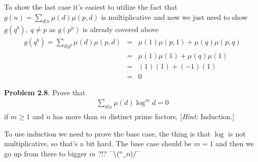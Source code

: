 \documentclass[aps,preprint,preprintnumbers,nofootinbib,showpacs,prd]{revtex4-1}
\newcommand{\nbea}{\begin{eqnarray*}}
\newcommand{\neea}{\end{eqnarray*}}
\newcommand{\dunno}{$ {}^{\mbox {--}}\backslash(^{\rm o}{}\underline{\hspace{0.2cm}}{\rm o})/^{\mbox {--}}$}
\begin{document}
To show the last case it's easiest to utilize the fact that $g(n) = \sum_{d|n}\mu(d)\mu(p,d)$ is multiplicative and now we just need to show $g(q^b), ~q\neq p$ as $g(p^a)$ is already covered above
%
\nbea
g(q^b) = \sum_{d|q^b}\mu(d)\mu(p,d) & = & \mu(1)\mu(p,1) + \mu(q)\mu(p,q) \\
& = & \mu(1)\mu(1) + \mu(q)\mu(1) \\
& = & (1)(1) + (-1)(1) \\
& = & 0
\neea
%

{\bf Problem 2.8}. Prove that
%
\nbea
\sum_{d|n} \mu(d) \log^m d = 0
\neea
%
if $m \ge 1$ and $n$ has more than $m$ distinct prime factors. [{\it Hint:} Induction.]

To use induction we need to prove the base case, the thing is that $\log$ is not multiplicative, so that's a bit hard. The base case should be $m = 1$ and then we go up from there to bigger $m$ ?!? \dunno
\end{document}
